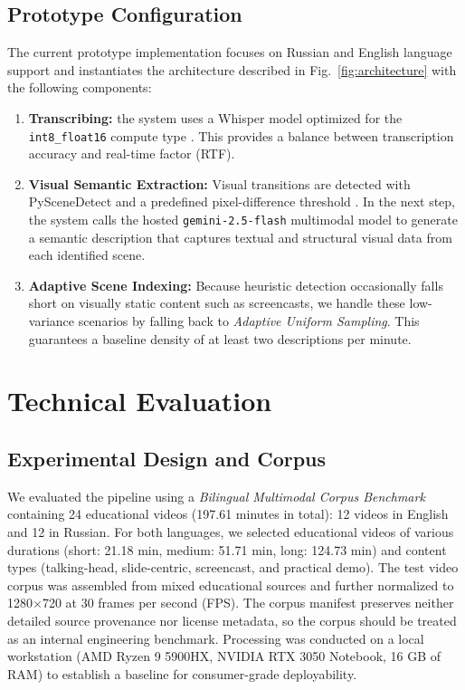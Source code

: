 \documentclass[conference]{IEEEtran}
\begin{document}
\subsection{Prototype Configuration}
The current prototype implementation focuses on Russian and English language support and instantiates the architecture described in Fig.~\ref{fig:architecture} with the following components:
\begin{enumerate}
\item \textbf{Transcribing:} the system uses a Whisper model optimized for the \texttt{int8\_float16} compute type \cite{Radford2022}. This provides a balance between transcription accuracy and real-time factor (RTF).
\item \textbf{Visual Semantic Extraction:} Visual transitions are detected with PySceneDetect and a predefined pixel-difference threshold \cite{PySceneDetect}. In the next step, the system calls the hosted \texttt{gemini-2.5-flash} multimodal model \cite{GeminiTeam2025} to generate a semantic description that captures textual and structural visual data from each identified scene.
\item \textbf{Adaptive Scene Indexing:} Because heuristic detection occasionally falls short on visually static content such as screencasts, we handle these low-variance scenarios by falling back to \emph{Adaptive Uniform Sampling}. This guarantees a baseline density of at least two descriptions per minute.
\end{enumerate}

\section{Technical Evaluation}
\subsection{Experimental Design and Corpus}
We evaluated the pipeline using a \emph{Bilingual Multimodal Corpus Benchmark} containing 24 educational videos (197.61 minutes in total): 12 videos in English and 12 in Russian. For both languages, we selected educational videos of various durations (short: 21.18 min, medium: 51.71 min, long: 124.73 min) and content types (talking-head, slide-centric, screencast, and practical demo). The test video corpus was assembled from mixed educational sources and further normalized to 1280$\times$720 at 30 frames per second (FPS). The corpus manifest preserves neither detailed source provenance nor license metadata, so the corpus should be treated as an internal engineering benchmark. Processing was conducted on a local workstation (AMD Ryzen 9 5900HX, NVIDIA RTX 3050 Notebook, 16 GB of RAM) to establish a baseline for consumer-grade deployability.
\end{document}
